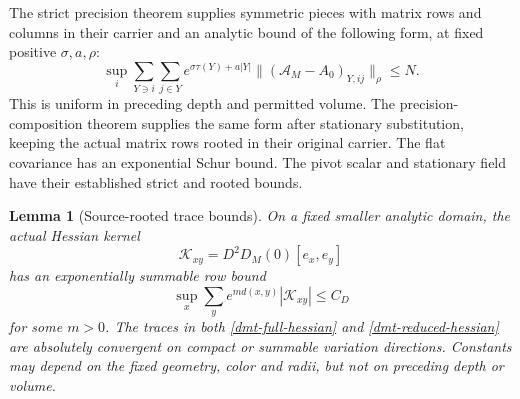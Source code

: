 \documentclass[11pt]{article}
\newtheorem{lemma}[theorem]{Lemma}
\theoremstyle{remark}
\begin{document}
The strict precision theorem supplies symmetric pieces with
matrix rows and columns in their carrier and an analytic bound
of the following form, at fixed positive
\(\sigma,a,\rho\):
\begin{equation}
 \sup_i\sum_{Y\ni i}\sum_{j\in Y}
 e^{\sigma\tau(Y)+a|Y|}
 \|(\mathscr A_M-A_0)_{Y,ij}\|_\rho\le N.
 \label{dmt-strict-row-input}
\end{equation}
This is uniform in preceding depth and permitted volume.
The precision-composition theorem supplies the same form
after stationary substitution, keeping the actual matrix
rows rooted in their original carrier. The flat covariance
has an exponential Schur bound. The pivot scalar and
stationary field have their established strict and rooted
bounds.

\begin{lemma}[Source-rooted trace bounds]
\label{dmt-trace-convergence}
On a fixed smaller analytic domain, the actual Hessian
kernel
\[
 \mathcal K_{xy}=D^2D_M(0)[e_x,e_y]
\]
has an exponentially summable row bound
\begin{equation}
       \sup_x\sum_y e^{m d(x,y)}|\mathcal K_{xy}|
                       \le C_D
 \label{dmt-kernel-decay}
\end{equation}
for some \(m>0\). The traces in both
\eqref{dmt-full-hessian} and
\eqref{dmt-reduced-hessian} are absolutely convergent on
compact or summable variation directions. Constants may
depend on the fixed geometry, color and radii, but not
on preceding depth or volume.
\end{lemma}
\end{document}
